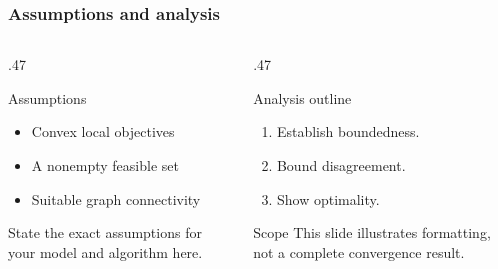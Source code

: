 \documentclass[10pt,aspectratio=169]{dgist_beamer}
\begin{document}
\begin{frame}
  \frametitle{Assumptions and analysis}
  \begin{columns}[T,onlytextwidth]
    \begin{column}{.47\textwidth}
      \begin{block}{Assumptions}
        \begin{itemize}
          \setlength{\itemsep}{.15cm}
          \item Convex local objectives
          \item A nonempty feasible set
          \item Suitable graph connectivity
        \end{itemize}
      \end{block}
      \vspace{.18cm}
      State the exact assumptions for your model and algorithm here.
    \end{column}
    \begin{column}{.47\textwidth}
      \begin{exampleblock}{Analysis outline}
        \begin{enumerate}
          \setlength{\itemsep}{.15cm}
          \item Establish boundedness.
          \item Bound disagreement.
          \item Show optimality.
        \end{enumerate}
      \end{exampleblock}
      \vspace{.18cm}
      \begin{alertblock}{Scope}
        This slide illustrates formatting, not a complete convergence result.
      \end{alertblock}
    \end{column}
  \end{columns}
\end{frame}
\end{document}

